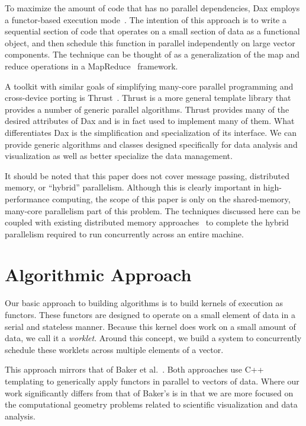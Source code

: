 \documentclass[conference]{IEEEtran}
\newcommand*{\lcite}[1]{~\cite{#1}}
\newcommand*{\scite}[1]{~\cite{#1}}
\newcommand{\etal}{et al.}
\newcommand*{\keyterm}[1]{\emph{#1}}
\begin{document}
To maximize the amount of code that has no parallel dependencies, Dax
employs a functor-based execution mode\lcite{Baker2010}.  The intention of
this approach is to write a sequential section of code that operates on a
small section of data as a functional object, and then schedule this
function in parallel independently on large vector components.  The
technique can be thought of as a generalization of the map and reduce
operations in a MapReduce\lcite{MapReduce} framework.

A toolkit with similar goals of simplifying many-core parallel programming
and cross-device porting is Thrust\lcite{Thrust}.  Thrust is a more general
template library that provides a number of generic parallel algorithms.
Thrust provides many of the desired attributes of Dax and is in fact used
to implement many of them.  What differentiates Dax is the simplification
and specialization of its interface.  We can provide generic algorithms and
classes designed specifically for data analysis and visualization as well
as better specialize the data management.

It should be noted that this paper does not cover message passing,
distributed memory, or ``hybrid'' parallelism.  Although this is clearly
important in high-performance computing, the scope of this paper is only on
the shared-memory, many-core parallelism part of this problem.  The
techniques discussed here can be coupled with existing distributed memory
approaches\lcite{Ahrens2000,Peterka2011} to complete the hybrid parallelism
required to run concurrently across an entire machine.

\section{Algorithmic Approach}
\label{sec:AlgorithmicApproach}

\noindent
Our basic approach to building algorithms is to build kernels of execution
as functors.  These functors are designed to operate on a small element of
data in a serial and stateless manner.  Because this kernel does work on a
small amount of data, we call it a \keyterm{worklet}.  Around this concept,
we build a system to concurrently schedule these worklets across multiple
elements of a vector.

This approach mirrors that of Baker \etal\scite{Baker2010}.  Both
approaches use C++ templating to generically apply functors in parallel to
vectors of data.  Where our work significantly differs from that of Baker's
is in that we are more focused on the computational geometry problems
related to scientific visualization and data analysis.
\end{document}
